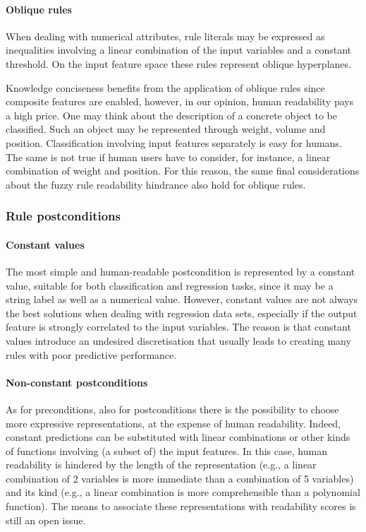 \documentclass[sigconf]{acmart}
\begin{document}
\paragraph{Oblique rules}

When dealing with numerical attributes, rule literals may be expressed as inequalities involving a linear combination of the input variables and a constant threshold.
%
On the input feature space these rules represent oblique hyperplanes.

Knowledge conciseness benefits from the application of oblique rules since composite features are enabled, however, in our opinion, human readability pays a high price.
%
One may think about the description of a concrete object to be classified.
%
Such an object may be represented through weight, volume and position.
%
Classification involving input features separately is easy for humans.
%
The same is not true if human users have to consider, for instance, a linear combination of weight and position.
%
For this reason, the same final considerations about the fuzzy rule readability hindrance also hold for oblique rules.

\subsubsection{Rule postconditions}

\paragraph{Constant values}

The most simple and human-readable postcondition is represented by a constant value, suitable for both classification and regression tasks, since it may be a string label as well as a numerical value.
%
However, constant values are not always the best solutions when dealing with regression data sets, especially if the output feature is strongly correlated to the input variables.
%
The reason is that constant values introduce an undesired discretisation that usually leads to creating many rules with poor predictive performance.

\paragraph{Non-constant postconditions}

As for preconditions, also for postconditions there is the possibility to choose more expressive representations, at the expense of human readability.
%
Indeed, constant predictions can be substituted with linear combinations or other kinds of functions involving (a subset of) the input features.
%
In this case, human readability is hindered by the length of the representation (e.g., a linear combination of 2 variables is more immediate than a combination of 5 variables) and its kind (e.g., a linear combination is more comprehensible than a polynomial function).
%
The means to associate these representations with readability scores is still an open issue.
\end{document}
